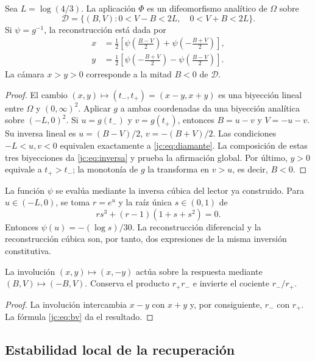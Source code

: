 \begin{theorem}
\label{jc:thm:global}
Sea $L=\log(4/3)$. La aplicación $\Phi$ es un difeomorfismo analítico
de $\Omega$ sobre
\begin{equation}
\mathcal D=\{(B,V):0<V-B<2L,\quad0<V+B<2L\}.
\label{jc:eq:diamante}
\end{equation}
Si $\psi=g^{-1}$, la reconstrucción está dada por
\begin{align}
x&=\frac12\left[\psi\!\left(\frac{B-V}{2}\right)
                   +\psi\!\left(-\frac{B+V}{2}\right)\right],\\
y&=\frac12\left[\psi\!\left(-\frac{B+V}{2}\right)
                   -\psi\!\left(\frac{B-V}{2}\right)\right].
\label{jc:eq:inversa}
\end{align}
La cámara $x>y>0$ corresponde a la mitad $B<0$ de $\mathcal D$.
\end{theorem}
\begin{proof}
El cambio $(x,y)\mapsto(t_-,t_+)=(x-y,x+y)$ es una biyección lineal
entre $\Omega$ y $(0,\infty)^2$. Aplicar $g$ a ambas coordenadas da
una biyección analítica sobre $(-L,0)^2$. Si
$u=g(t_-)$ y $v=g(t_+)$, entonces $B=u-v$ y $V=-u-v$.
Su inversa lineal es $u=(B-V)/2$, $v=-(B+V)/2$.
Las condiciones $-L<u,v<0$ equivalen exactamente a
\eqref{jc:eq:diamante}. La composición de estas tres biyecciones da
\eqref{jc:eq:inversa} y prueba la afirmación global.
Por último, $y>0$ equivale a $t_+>t_-$; la monotonía de $g$ la
transforma en $v>u$, es decir, $B<0$.
\end{proof}

La función $\psi$ se evalúa mediante la inversa cúbica del lector ya
construido. Para $u\in(-L,0)$, se toma $r=e^u$ y la raíz única
$s\in(0,1)$ de
\[
rs^3+(r-1)(1+s+s^2)=0.
\]
Entonces $\psi(u)=-(\log s)/30$. La reconstrucción diferencial y
la reconstrucción cúbica son, por tanto, dos expresiones de la misma
inversión constitutiva.

\begin{corollary}
La involución $(x,y)\mapsto(x,-y)$ actúa sobre la respuesta mediante
$(B,V)\mapsto(-B,V)$. Conserva el producto $r_+r_-$ e invierte el
cociente $r_-/r_+$.
\end{corollary}
\begin{proof}
La involución intercambia $x-y$ con $x+y$ y, por consiguiente,
$r_-$ con $r_+$. La fórmula \eqref{jc:eq:bv} da el resultado.
\end{proof}

\subsection{Estabilidad local de la recuperación}

